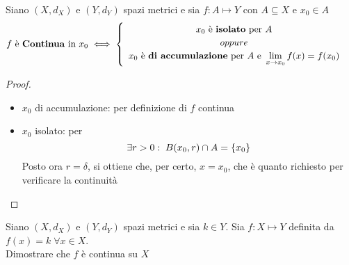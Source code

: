 \begin{proposition}
	Siano $(X,d_X)$ e $(Y,d_Y)$ spazi metrici e sia $f: A \mapsto Y$ con $A \subseteq X$ e $x_0 \in A$
	\begin{equation}
		f \text{ è \textbf{Continua} in } x_0 \iff
		\begin{cases}
			\begin{array}{c}
				x_0 \text{ è \textbf{isolato} per } A\\
				oppure\\
				x_0 \text{ è \textbf{di accumulazione} per } A \text{ e } \lim\limits_{x \to x_0} f(x) = f(x_0)
			\end{array}
		\end{cases}
	\end{equation}
	\begin{proof}~
		\begin{itemize}
			\item $x_0$ di accumulazione: per definizione di $f$ continua
			\item $x_0$ isolato: per 
				$$\exists r > 0:\; B(x_0, r) \cap A = \left\{x_0\right\}$$
				Posto ora $r = \delta$, si ottiene che, per certo, $x = x_0$, che è quanto richiesto per verificare la continuità
		\end{itemize}
	\end{proof}
\end{proposition}
\begin{exercise}
	Siano $(X,d_X)$ e $(Y,d_Y)$ spazi metrici e sia $k \in Y$. Sia $f:X \mapsto Y$ definita da $f(x) = k \; \forall x \in X$.\\
	Dimostrare che $f$ è continua su $X$
\end{exercise}

